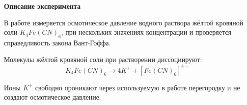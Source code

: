 \textbf{\Large Описание эксперимента}

В работе измеряется осмотическое давление водного раствора жёлтой кровяной соли $K_4 Fe (CN)_6$, при нескольких значениях концентрации и проверяется справедливость закона Вант-Гоффа.

Молекулы жёлтой кровяной соли при растворении диссоциируют:
$$
K_4 Fe (CN)_6 \rightarrow 4 K^+ + [Fe (CN)_6]^{4-}
$$

Ионы $K^+$ свободно проникают через используемую в работе перегородку и не создают осмотическое давление.